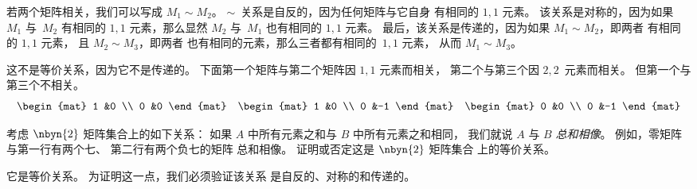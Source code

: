 \begin{exercises}
\begin{answer}
\begin{exparts}
          若两个矩阵相关，我们可以写成 $M_1\sim M_2$。
          $\sim$~关系是自反的，因为任何矩阵与它自身
          有相同的 $1,1$ 元素。
          该关系是对称的，因为如果 $M_1$ 与~$M_2$ 有相同的 $1,1$
          元素，那么显然 $M_2$ 与~$M_1$ 也有相同的
          $1,1$ 元素。
          最后，该关系是传递的，因为如果 $M_1\sim M_2$，即两者
          有相同的 $1,1$ 元素，
          且 $M_2\sim M_3$，即两者
          也有相同的元素，那么三者都有相同的~$1,1$ 元素，
          从而 $M_1\sim M_3$。 

       \partsitem
          这不是等价关系，因为它不是传递的。
          下面第一个矩阵与第二个矩阵因 $1,1$ 元素而相关，
          第二个与第三个因 $2,2$~元素而相关。
          但第一个与第三个不相关。
          \begin{equation*}
            \begin{mat}
              1 &0 \\
              0 &0
            \end{mat}
            \quad
            \begin{mat}
              1 &0 \\
              0 &-1
            \end{mat}
            \quad
            \begin{mat}
              0 &0 \\
              0 &-1
            \end{mat}
          \end{equation*}
     \end{exparts}
   \end{answer}
 \item \cite{Cleary}
    考虑 $\nbyn{2}$ 矩阵集合上的如下关系：  
    如果 $A$ 中所有元素之和与 $B$ 中所有元素之和相同，
    我们就说 $A$ 与 $B$ \textit{总和相像}。  
    例如，零矩阵与第一行有两个七、
    第二行有两个负七的矩阵
    总和相像。
    证明或否定这是 $\nbyn{2}$ 矩阵集合
    上的等价关系。
    \begin{answer}
      它是等价关系。
      为证明这一点，我们必须验证该关系
      是自反的、对称的和传递的。


\end{answer}
\end{exercises}
